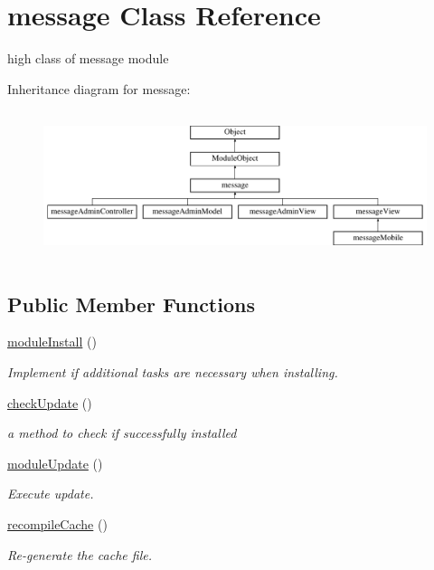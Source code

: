 \hypertarget{classmessage}{}\section{message Class Reference}
\label{classmessage}


high class of message module  


Inheritance diagram for message\+:\begin{figure}[H]
\begin{center}
\leavevmode
\includegraphics[height=4.375000cm]{classmessage}
\end{center}
\end{figure}
\subsection*{Public Member Functions}
\begin{DoxyCompactItemize}
\item 
\hyperlink{classmessage_a649a72a242c308a98be4fb5e990b3212}{module\+Install} ()
\begin{DoxyCompactList}\small\item\em Implement if additional tasks are necessary when installing. \end{DoxyCompactList}\item 
\hyperlink{classmessage_a682929b12e71f071a533e16e4f262cc1}{check\+Update} ()
\begin{DoxyCompactList}\small\item\em a method to check if successfully installed \end{DoxyCompactList}\item 
\hyperlink{classmessage_ad57e7bdf84c463626454a18ead0ff1ce}{module\+Update} ()
\begin{DoxyCompactList}\small\item\em Execute update. \end{DoxyCompactList}\item 
\hyperlink{classmessage_afb564d4a4be415199786f368e9d6a243}{recompile\+Cache} ()
\begin{DoxyCompactList}\small\item\em Re-\/generate the cache file. \end{DoxyCompactList}\end{DoxyCompactItemize}
